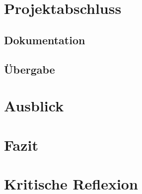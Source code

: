 

































\section{Projektabschluss}
\subsection{Dokumentation}
\subsection{Übergabe}
\section{Ausblick}
\section{Fazit}
\section{Kritische Reflexion}